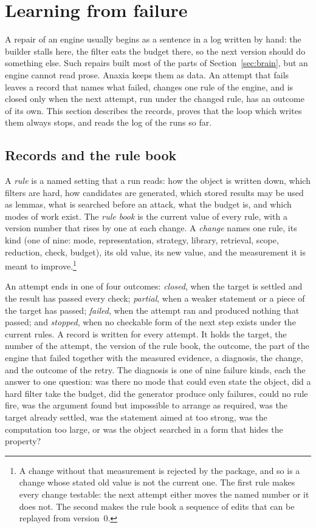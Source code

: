 \section{Learning from failure}\label{sec:selfmod}

A repair of an engine usually begins as a sentence in a log written by hand: the builder stalls here, the filter eats the budget there, so the next version should do something else. Such repairs built most of the parts of Section~\ref{sec:brain}, but an engine cannot read prose. Anaxia keeps them as data. An attempt that fails leaves a record that names what failed, changes one rule of the engine, and is closed only when the next attempt, run under the changed rule, has an outcome of its own. This section describes the records, proves that the loop which writes them always stops, and reads the log of the runs so far.

\subsection{Records and the rule book}\label{ssec:records}

A \emph{rule} is a named setting that a run reads: how the object is written down, which filters are hard, how candidates are generated, which stored results may be used as lemmas, what is searched before an attack, what the budget is, and which modes of work exist. The \emph{rule book} is the current value of every rule, with a version number that rises by one at each change. A \emph{change} names one rule, its kind (one of nine: mode, representation, strategy, library, retrieval, scope, reduction, check, budget), its old value, its new value, and the measurement it is meant to improve.\footnote{A change without that measurement is rejected by the package, and so is a change whose stated old value is not the current one. The first rule makes every change testable: the next attempt either moves the named number or it does not. The second makes the rule book a sequence of edits that can be replayed from version~0.}

An attempt ends in one of four outcomes: \emph{closed}, when the target is settled and the result has passed every check; \emph{partial}, when a weaker statement or a piece of the target has passed; \emph{failed}, when the attempt ran and produced nothing that passed; and \emph{stopped}, when no checkable form of the next step exists under the current rules. A record is written for every attempt. It holds the target, the number of the attempt, the version of the rule book, the outcome, the part of the engine that failed together with the measured evidence, a diagnosis, the change, and the outcome of the retry. The diagnosis is one of nine failure kinds, each the answer to one question: was there no mode that could even state the object, did a hard filter take the budget, did the generator produce only failures, could no rule fire, was the argument found but impossible to arrange as required, was the target already settled, was the statement aimed at too strong, was the computation too large, or was the object searched in a form that hides the property?

